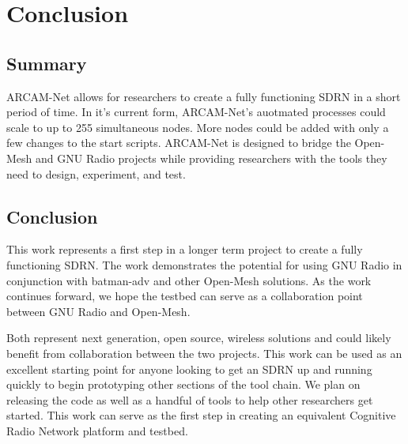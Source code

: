 
\chapter{Conclusion} %

\label{Chapter6} %




\section{Summary}

ARCAM-Net allows for researchers to create a fully functioning SDRN in a short period of time. In it's current form, ARCAM-Net's auotmated processes could scale to up to 255 simultaneous nodes. More nodes could be added with only a few changes to the start scripts. ARCAM-Net is designed to bridge the Open-Mesh and GNU Radio projects while providing researchers with the tools they need to design, experiment, and test. 


\section{Conclusion}

This work represents a first step in a longer term project to create a fully functioning SDRN. The work demonstrates the potential for using GNU Radio in conjunction with batman-adv and other Open-Mesh solutions. As the work continues forward, we hope the testbed can serve as a collaboration point between GNU Radio and Open-Mesh.

Both represent next generation, open source, wireless solutions and could likely benefit from collaboration between the two projects. This work can be used as an excellent starting point for anyone looking to get an SDRN up and running quickly to begin prototyping other sections of the tool chain. We plan on releasing the code as well as a handful of tools to help other researchers get started. This work can serve as the first step in creating an equivalent Cognitive Radio Network platform and testbed. 

